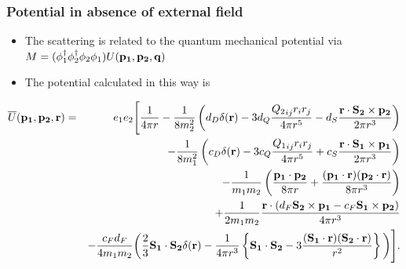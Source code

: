 \documentclass[11ppt]{beamer}
\newcommand{\beqa}{\begin{eqnarray*} }
\newcommand{\eeqa}{\end{eqnarray*} }
\begin{document}
\begin{frame}
\frametitle{Potential in absence of external field}

\begin{itemize}
\item The scattering is related to the quantum mechanical potential via $M = (\phi^\dagger_1 \phi^\dagger_2 \phi_2 \phi_1) U(\mathbf{p_1}, \mathbf{p_2}, \mathbf{q})$

\item The potential calculated in this way is
\end{itemize}
\footnotesize
\beqa
	\overline{U}(\v{p_1}, \v{p_2}, \v{r}) &=& 	
	 e_1 e_2 \Bigg[ 
		\frac{1}{4\pi r} 
		- \frac{1}{8m_2^2}\left ( d_D \delta(\v{r})  - 3 d_Q \frac{{Q_2}_{ij} r_i r_j}{4 \pi r^5}   - d_S \frac{\v{r} \cdot \v{S_2} \times \v{p_2} }{2\pi r^3}   \right )
 	\\&&	- \frac{1}{8m_1^2}\left ( c_D \delta(\v{r}) - 3 c_Q \frac{{Q_1}_{ij} r_i r_j}{4 \pi r^5}  + c_S \frac{\v{r} \cdot \v{S_1} \times \v{p_1} }{2\pi r^3}   \right )
	\\&&	- \frac{1}{m_1 m_2}\left( \frac{\v{p_1} \cdot \v{p_2}}{8\pi r} + \frac{(\v{p_1} \cdot \v{r}) (\v{p_2} \cdot \v{r}) }{8 \pi r^3}  \right ) 
	\\&&	+ \frac{1}{2 m_1 m_2} \frac{ \v{r} \cdot ( d_F \v{S_2} \times \v{p_1} - c_F \v{S_1} \times \v{p_2} )}{4\pi r^3}
	\\&&	- \frac{c_F d_F }{4 m_1 m_2}\bigg( \frac{2}{3} \v{S_1} \cdot \v{S_2} \delta(\v{r}) 
			- \frac{1}{4\pi r^3} \left\{ \v{S_1} \cdot \v{S_2} - 3 \frac{(\v{S_1} \cdot \v{r}) (\v{S_2} \cdot \v{r}) }{r^2}  \right \}  \bigg)
	\Bigg].
\eeqa
\normalsize

\end{frame}
\end{document}
